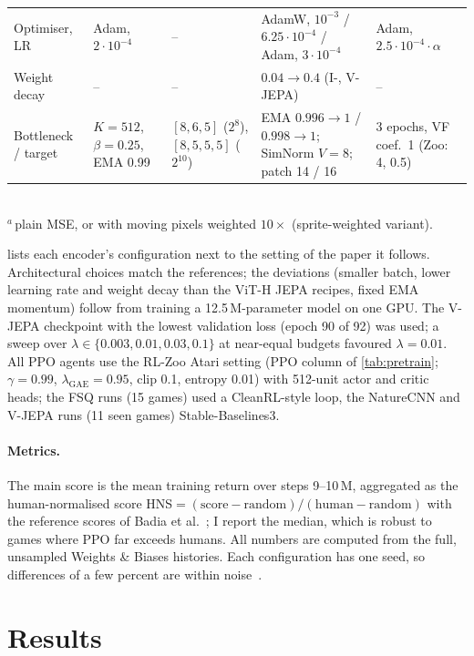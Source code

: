 \documentclass[runningheads]{llncs}
\begin{document}
\begin{table}[t]
\begin{tabular}{@{}Y{1.6cm}Y{2.25cm}Y{2.2cm}Y{2.95cm}Y{2.25cm}@{}}
Optimiser, LR & Adam, $2{\cdot}10^{-4}$ & -- & AdamW, $10^{-3}$ / $6.25{\cdot}10^{-4}$ / Adam, $3{\cdot}10^{-4}$ &
  Adam, $2.5{\cdot}10^{-4}\cdot\alpha$ \\
Weight decay & -- & -- & $0.04\to0.4$ (I-, V-JEPA) & -- \\
Bottleneck / target & $K{=}512$, $\beta{=}0.25$, EMA 0.99 & $[8,6,5]$ ($2^8$), $[8,5,5,5]$ ($2^{10}$) &
  EMA $0.996\to1$ / $0.998\to1$; SimNorm $V{=}8$; patch 14 / 16 & 3 epochs, VF coef.\ 1 (Zoo: 4, 0.5) \\
\bottomrule
\end{tabular}\\[2pt]
{\scriptsize $^{a}$\,plain MSE, or with moving pixels weighted $10\times$ (sprite-weighted variant).}
\end{table}

 lists each encoder's configuration next to the setting of the paper it
follows. Architectural choices match the references; the deviations (smaller batch, lower
learning rate and weight decay than the ViT-H JEPA recipes, fixed EMA momentum) follow from
training a 12.5\,M-parameter model on one GPU. The V-JEPA checkpoint with the lowest
validation loss (epoch 90 of 92) was used; a sweep over $\lambda\in\{0.003,0.01,0.03,0.1\}$
at near-equal budgets favoured $\lambda=0.01$. All PPO agents use the RL-Zoo Atari setting
(PPO column of \cref{tab:pretrain}; $\gamma=0.99$, $\lambda_{\text{GAE}}=0.95$, clip 0.1,
entropy 0.01) with 512-unit actor and critic heads; the FSQ runs (15 games) used a
CleanRL-style loop, the NatureCNN and V-JEPA runs (11 seen games) Stable-Baselines3.

\paragraph{Metrics.} The main score is the mean training return over steps 9--10\,M,
aggregated as the human-normalised score HNS$=(\text{score}-\text{random})/(\text{human}-\text{random})$
with the reference scores of Badia et al.~\cite{badia2020agent57}; I report the median, which
is robust to games where PPO far exceeds humans. All numbers are computed from the full,
unsampled Weights \& Biases histories. Each configuration has one
seed, so differences of a few percent are within noise~\cite{agarwal2021precipice}.

\section{Results}
\label{sec:results}
\end{document}
